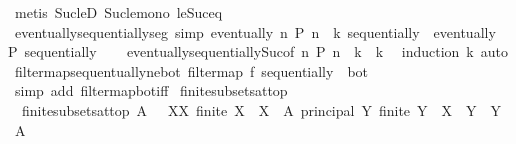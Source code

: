 \begin{isabellebody}
\ {\isacharparenleft}{\kern0pt}metis\ Suc{\isacharunderscore}{\kern0pt}le{\isacharunderscore}{\kern0pt}D\ Suc{\isacharunderscore}{\kern0pt}le{\isacharunderscore}{\kern0pt}mono\ le{\isacharunderscore}{\kern0pt}Suc{\isacharunderscore}{\kern0pt}eq{\isacharparenright}{\kern0pt}%
\endisatagproof
{\isafoldproof}%
%
\isadelimproof
\isanewline
%
\endisadelimproof
\isanewline
{}\isamarkupfalse%
\ eventually{\isacharunderscore}{\kern0pt}sequentially{\isacharunderscore}{\kern0pt}seg\ {\isacharbrackleft}{\kern0pt}simp{\isacharbrackright}{\kern0pt}{\isacharcolon}{\kern0pt}\ {\isachardoublequoteopen}eventually\ {\isacharparenleft}{\kern0pt}{\isasymlambda}n{\isachardot}{\kern0pt}\ P\ {\isacharparenleft}{\kern0pt}n\ {\isacharplus}{\kern0pt}\ k{\isacharparenright}{\kern0pt}{\isacharparenright}{\kern0pt}\ sequentially\ {\isasymlongleftrightarrow}\ eventually\ P\ sequentially{\isachardoublequoteclose}\isanewline
%
\isadelimproof
\ \ %
\endisadelimproof
%
\isatagproof
{}\isamarkupfalse%
\ eventually{\isacharunderscore}{\kern0pt}sequentially{\isacharunderscore}{\kern0pt}Suc{\isacharbrackleft}{\kern0pt}of\ {\isachardoublequoteopen}{\isasymlambda}n{\isachardot}{\kern0pt}\ P\ {\isacharparenleft}{\kern0pt}n\ {\isacharplus}{\kern0pt}\ k{\isacharparenright}{\kern0pt}{\isachardoublequoteclose}\ \ k{\isacharbrackright}{\kern0pt}\ \isamarkupfalse%
\ {\isacharparenleft}{\kern0pt}induction\ k{\isacharparenright}{\kern0pt}\ auto%
\endisatagproof
{\isafoldproof}%
%
\isadelimproof
\isanewline
%
\endisadelimproof
\isanewline
{}\isamarkupfalse%
\ filtermap{\isacharunderscore}{\kern0pt}sequentually{\isacharunderscore}{\kern0pt}ne{\isacharunderscore}{\kern0pt}bot{\isacharcolon}{\kern0pt}\ {\isachardoublequoteopen}filtermap\ f\ sequentially\ {\isasymnoteq}\ bot{\isachardoublequoteclose}\isanewline
%
\isadelimproof
\ \ %
\endisadelimproof
%
\isatagproof
{}\isamarkupfalse%
\ {\isacharparenleft}{\kern0pt}simp\ add{\isacharcolon}{\kern0pt}\ filtermap{\isacharunderscore}{\kern0pt}bot{\isacharunderscore}{\kern0pt}iff{\isacharparenright}{\kern0pt}%
\endisatagproof
{\isafoldproof}%
%
\isadelimproof
%
\endisadelimproof
%
\isadelimdocument
%
\endisadelimdocument
%
\isatagdocument
%
\isamarkuptrue%
%
\endisatagdocument
{\isafolddocument}%
%
\isadelimdocument
%
\endisadelimdocument
{}\isamarkupfalse%
\ finite{\isacharunderscore}{\kern0pt}subsets{\isacharunderscore}{\kern0pt}at{\isacharunderscore}{\kern0pt}top\ \isanewline
\ \ {\isachardoublequoteopen}finite{\isacharunderscore}{\kern0pt}subsets{\isacharunderscore}{\kern0pt}at{\isacharunderscore}{\kern0pt}top\ A\ {\isacharequal}{\kern0pt}\ {\isacharparenleft}{\kern0pt}{\isasymSqinter}\ X{\isasymin}{\isacharbraceleft}{\kern0pt}X{\isachardot}{\kern0pt}\ finite\ X\ {\isasymand}\ X\ {\isasymsubseteq}\ A{\isacharbraceright}{\kern0pt}{\isachardot}{\kern0pt}\ principal\ {\isacharbraceleft}{\kern0pt}Y{\isachardot}{\kern0pt}\ finite\ Y\ {\isasymand}\ X\ {\isasymsubseteq}\ Y\ {\isasymand}\ Y\ {\isasymsubseteq}\ A{\isacharbraceright}{\kern0pt}{\isacharparenright}{\kern0pt}{\isachardoublequoteclose}\isanewline

\end{isabellebody}
